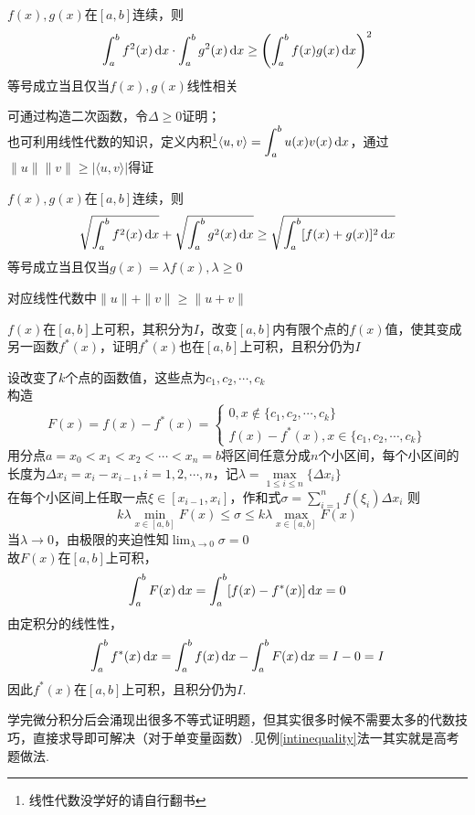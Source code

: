 \begin{theorem}
$f(x),g(x)$在$[a,b]$连续，则
\[\int_a^bf^2(x)\,\mathrm{d} x\cdot \int_a^bg^2(x)\,\mathrm{d} x\geq\left(\int_a^bf(x)g(x)\,\mathrm{d} x\right)^2\]
等号成立当且仅当$f(x),g(x)$线性相关
\end{theorem}
\begin{analysis}
可通过构造二次函数，令$\Delta\geq0$证明；\\
也可利用线性代数的知识，定义内积\footnote{线性代数没学好的请自行翻书}$\displaystyle	\langle u,v\rangle=\int_a^bu(x)v(x)\,\mathrm{d} x$，通过$\|u\|\|v\|\geq|\langle u,v\rangle|$得证
\end{analysis}
\begin{theorem}
$f(x),g(x)$在$[a,b]$连续，则
\[\sqrt{\int_a^bf^2(x)\,\mathrm{d} x} + \sqrt{\int_a^bg^2(x)\,\mathrm{d} x}\geq\sqrt{\int_a^b[f(x)+g(x)]^2\,\mathrm{d} x}\]
等号成立当且仅当$g(x)=\lambda f(x),\lambda\geq 0$
\end{theorem}
\begin{analysis}
对应线性代数中$\|u\|+\|v\|\geq\|u+v\|$
\end{analysis}
\begin{example}
$f(x)$在$[a,b]$上可积，其积分为$I$，改变$[a,b]$内有限个点的$f(x)$值，使其变成另一函数$f^*(x)$，证明$f^*(x)$也在$[a,b]$上可积，且积分仍为$I$
\end{example}
\begin{analysis}
设改变了$k$个点的函数值，这些点为$c_1,c_2,\cdots,c_k$\\
构造
\[F(x)=f(x)-f^*(x)=\begin{cases}
0,x\notin\{c_1,c_2,\cdots,c_k\}\\
f(x)-f^*(x),x\in\{c_1,c_2,\cdots,c_k\}
\end{cases}\]
用分点$a=x_0<x_1<x_2<\cdots<x_n=b$将区间任意分成$n$个小区间，每个小区间的长度为$\Delta x_i=x_i-x_{i-1},i=1,2,\cdots,n$，记$\lambda = \underset{1\leq i\leq n}{\max}\{\Delta x_i\}$\\
在每个小区间上任取一点$\xi\in[x_{i-1},x_i]$，作和式$\displaystyle\sigma = \sum_{i=1}^{n}f(\xi_i)\Delta x_i$
则
\[k\lambda\underset{x\in[a,b]}{\min}F(x)\leq\sigma\leq k\lambda\underset{x\in[a,b]}{\max}F(x)\]
当$\lambda\to 0$，由极限的夹迫性知$\displaystyle\lim_{\lambda\to 0}\sigma=0$\\
故$F(x)$在$[a,b]$上可积，
\[\int_a^b F(x)\,\mathrm{d} x=\int_a^b[f(x)-f^*(x)]\,\mathrm{d} x=0\]
由定积分的线性性，
\[\int_a^b f^*(x)\,\mathrm{d} x=\int_a^b f(x)\,\mathrm{d} x-\int_a^b F(x)\,\mathrm{d} x=I-0=I\]
因此$f^*(x)$在$[a,b]$上可积，且积分仍为$I$.
\end{analysis}
\par 学完微分积分后会涌现出很多不等式证明题，但其实很多时候不需要太多的代数技巧，直接求导即可解决（对于单变量函数）.见例\ref{intinequality}法一其实就是高考题做法.
